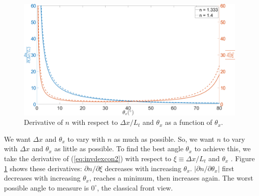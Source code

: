 \documentclass{svjour3}                     %
\begin{document}
%

\begin{figure}[hpbt]
	\includegraphics[width=\textwidth, keepaspectratio]{diffnsimple.png}
	\caption{Derivative of $n$ with respect to $\Delta x / L_t$ and $\theta_x$ as a function of $\theta_x$.}		
	\label{fig:diffnsimple}
\end{figure}

We want $\Delta x$ and $\theta_x$ to vary with $n$ as much as possible. So, we want $n$ to vary with $\Delta x$ and $\theta_x$ as little as possible. To find the best angle $\theta_x$ to achieve this, we take the derivative of (\ref{eq:invdexcon2}) with respect to $\xi \equiv \Delta x/L_t$ and $\theta_x$ \cite{nemoto1992measurement}. Figure \ref{fig:diffnsimple} shows these derivatives: $\partial n/\partial \xi$ decreases with increasing $\theta_x$. $\left|\partial n/\partial \theta_x\right|$ first decreases with increasing $\theta_x$, reaches a minimum, then increases again. The worst possible angle to measure is $0^\circ$, the classical front view.

\end{document}
